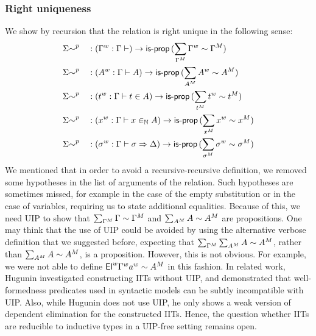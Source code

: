   \subsubsection{Right uniqueness}
  We show by recursion that the relation is right unique in the following sense:
  \begin{alignat*}{5}
    &
    {\Sigma{\sim}}^p
    && : ({\Gamma}^w : \Gamma \vdash ) \rightarrow
    \mathsf{is\text{-}prop}\, (\sum_{{\Gamma}^M} {\Gamma}^w \sim {\Gamma}^M)
    \\
    &
    {\Sigma{\sim}}^p
    && : ({A}^w : \Gamma \vdash A) \rightarrow
    \mathsf{is\text{-}prop}\, (\sum_{{A}^M} {A}^w \sim {A}^M)
    \\
    &
    {\Sigma{\sim}}^p
    && : ({t}^w : \Gamma \vdash t \in A) \rightarrow
    \mathsf{is\text{-}prop}\, (\sum_{{t}^M} {t}^w \sim {t}^M)
    \\
    &
    {\Sigma{\sim}}^p
    && : ({x}^w : \Gamma \vdash x \in_{\mathbb{N}} A) \rightarrow
    \mathsf{is\text{-}prop}\, (\sum_{{x}^M} {x}^w \sim {x}^M)
    \\
    &
    {\Sigma{\sim}}^p
    && : ({\sigma}^w : \Gamma \vdash \sigma \Rightarrow \Delta) \rightarrow
    \mathsf{is\text{-}prop}\, (\sum_{{\sigma}^M} {\sigma}^w \sim {\sigma}^M)
  \end{alignat*}
  We mentioned that in order to avoid a recursive-recursive definition, we
  removed some hypotheses in the list of arguments of the relation. Such
  hypotheses are sometimes missed, for example in the case of the empty
  substitution or in the case of variables, requiring us to state additional
  equalities. Because of this, we need UIP to show that
  $\sum_{{\Gamma}^M}\Gamma\sim{\Gamma}^M$ and
  $\sum_{{A}^M}A\sim{A}^M$ are propositions.  One may think that the use
  of UIP could be avoided by using the alternative verbose definition that we
  suggested before, expecting that
  $\sum_{{\Gamma}^M}\sum_{{A}^M}A\sim{A}^M$, rather than
  $\sum_{{A}^M}A\sim{A}^M$, is a proposition.  However, this is not
  obvious. For example, we were not able to define
  ${\mathsf{El}}^w{\Gamma}^w{a}^w\sim {A}^M$ in this fashion. In related work,
  Hugunin investigated constructing IITs without
  UIP\cite{hugunin2019constructing}, and demonstrated that well-formedness
  predicates used in syntactic models can be subtly incompatible with UIP. Also,
  while Hugunin does not use UIP, he only shows a weak version of dependent
  elimination for the constructed IITs. Hence, the question whether IITs are
  reducible to inductive types in a UIP-free setting remains open.




